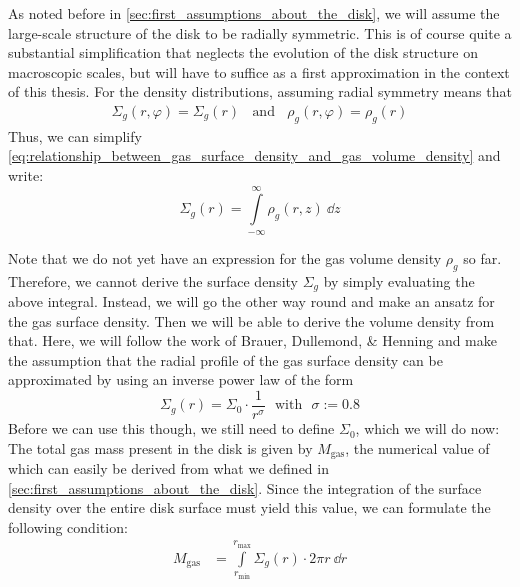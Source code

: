         As noted before in \cref{sec:first_assumptions_about_the_disk}, %
        we will assume the large-scale structure of the disk to be radially symmetric.
        This is of course quite a substantial simplification 
        that neglects the evolution of the disk structure on macroscopic scales,
        but will have to suffice as a first approximation in the context of this thesis.
        For the density distributions, assuming radial symmetry means that
        \begin{align}
            \Sigma_g(r, \varphi) 
                = \Sigma_g(r) 
            \ \ \ \ \text{and}\ \ \ \
            \rho_g(r, \varphi) 
                = \rho_g(r)
        \end{align}
        Thus, we can simplify 
        \cref{eq:relationship_between_gas_surface_density_and_gas_volume_density} and write:
        \begin{equation}
            \Sigma_g(r)
                = \int\limits_{-\infty}^{\infty} \rho_g(r,z)\ \dd z
        \end{equation}
        
        Note that we do not yet have an expression for the gas volume density $\rho_g$ so far.
        Therefore, we cannot derive the surface density $\Sigma_g$ by simply evaluating the above
        integral. Instead, we will go the other way round and make an ansatz for the gas surface
        density. Then we will be able to derive the volume density from that. 
        Here, we will 
        follow the work of Brauer, Dullemond, \& Henning \cite{brauer_dullemond_henning_2007}
        and make the assumption that the radial profile of the gas surface density can be 
        approximated by using an inverse power law of the form
        \begin{equation}
            \label{eq:gas_surface_density_profile_inverse_power_law_ansatz}
            \Sigma_g(r) = \Sigma_0\cdot\frac{1}{r^\sigma}
            \ \ \ \text{with}\ \ \
            \sigma := 0.8
        \end{equation}  %
        Before we can use this though, we still need to define $\Sigma_0$, which we will do now: \\

        The total gas mass present in the disk is given by $M_\text{gas}$, the numerical value of 
        which can easily be derived from what we defined in
        \cref{sec:first_assumptions_about_the_disk}. Since the integration of the surface density 
        over the entire disk surface must yield this value, we can formulate the following 
        condition:
        \begin{align}
            M_\text{gas}
                &= \int\limits_{r_\text{min}}^{r_\text{max}} \Sigma_g(r) \cdot 2\pi r \ \dd r
        \end{align}

